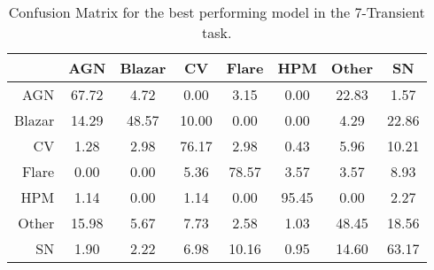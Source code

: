 \begin{table*}
\centering
\begin{tabular}{|r|c|c|c|c|c|c|c|}
\hline
\multicolumn{1}{|l|}{} & AGN    & Blazar    & CV   & Flare   & HPM   & Other   & SN \\ \hline \hline
AGN                & 67.72       & 4.72       & 0.00      & 3.15      & 0.00      & 22.83      & 1.57      \\ \hline
Blazar                & 14.29       & 48.57       & 10.00      & 0.00      & 0.00      & 4.29      & 22.86          \\ \hline
CV                & 1.28       & 2.98       & 76.17      & 2.98      & 0.43      & 5.96      & 10.21          \\ \hline
Flare                & 0.00       & 0.00       & 5.36      & 78.57      & 3.57      & 3.57      & 8.93          \\ \hline
HPM                & 1.14       & 0.00       & 1.14      & 0.00      & 95.45      & 0.00      & 2.27          \\ \hline
Other                & 15.98       & 5.67       & 7.73      & 2.58      & 1.03      & 48.45      & 18.56          \\ \hline
SN                & 1.90       & 2.22       & 6.98      & 10.16      & 0.95      & 14.60      & 63.17          \\ \hline
\end{tabular}
\caption{Confusion Matrix for the best performing model in the 7-Transient task.}
\label{Confusion-7-Transient}
\end{table*}

